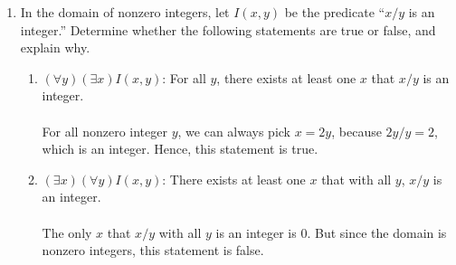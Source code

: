 \documentclass[12pt]{article}
\begin{document}
\begin{enumerate}
      \item In the domain of nonzero integers, let $I(x, y)$ be the predicate “$x/y$ is an integer.” Determine whether the following statements are true or false, and explain why.
            \begin{enumerate}
                  \item $(\forall y)(\exists x)I(x, y)$: For all $y$, there exists at least one $x$ that $x/y$ is an integer.\\~\\
                        For all nonzero integer $y$, we can always pick $x = 2y$, because $2y/y = 2$, which is an integer. Hence, this statement is true.\\
                  \item $(\exists x)(\forall y)I(x, y)$: There exists at least one $x$ that with all $y$, $x/y$ is an integer.\\~\\
                        The only $x$ that $x/y$ with all $y$ is an integer is 0. But since the domain is nonzero integers, this statement is false.
            \end{enumerate}


\end{enumerate}
\end{document}
